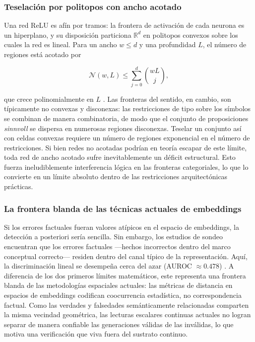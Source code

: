 \documentclass{article}
\begin{document}
\hypertarget{teselaciuxf3n-por-politopos-con-ancho-acotado}{%
\subsubsection{Teselación por politopos con ancho
acotado}\label{teselaciuxf3n-por-politopos-con-ancho-acotado}}

Una red ReLU es afín por tramos: la frontera de activación de cada
neurona es un hiperplano, y su disposición particiona \(\mathbb{R}^d\)
en politopos convexos sobre los cuales la red es lineal. Para un ancho
\(w \le d\) y una profundidad \(L\), el número de regiones está acotado
por

\[\mathcal{N}(w, L) \le \sum_{j=0}^{d} \binom{wL}{j},\]

que crece polinomialmente en \(L\) \citep{hanin2017universal}. Las
fronteras del sentido, en cambio, son típicamente no convexas y
disconexas: las restricciones de tipo sobre los símbolos se combinan de
manera combinatoria, de modo que el conjunto de proposiciones
\emph{sinnvoll} se dispersa en numerosas regiones disconexas. Teselar un
conjunto así con celdas convexas requiere un número de regiones
exponencial en el número de restricciones. Si bien redes no acotadas
podrían en teoría escapar de este límite, toda red de ancho acotado
sufre inevitablemente un déficit estructural. Esto fuerza
ineludiblemente interferencia lógica en las fronteras categoriales, lo
que lo convierte en un límite absoluto dentro de las restricciones
arquitectónicas prácticas.

\hypertarget{la-frontera-blanda-de-las-tuxe9cnicas-actuales-de-embeddings}{%
\subsubsection{La frontera blanda de las técnicas actuales de
embeddings}\label{la-frontera-blanda-de-las-tuxe9cnicas-actuales-de-embeddings}}

Si los errores factuales fueran valores atípicos en el espacio de
embeddings, la detección a posteriori sería sencilla. Sin embargo, los
estudios de sondeo encuentran que los errores factuales ---hechos
incorrectos dentro del marco conceptual correcto--- residen dentro del
canal típico de la representación. Aquí, la discriminación lineal se
desempeña cerca del azar (AUROC \(\approx 0.478\))
\citep{wei2024measuring}. A diferencia de los dos primeros límites
matemáticos, este representa una frontera blanda de las metodologías
espaciales actuales: las métricas de distancia en espacios de embeddings
codifican coocurrencia estadística, no correspondencia factual. Como las
verdades y falsedades semánticamente relacionadas comparten la misma
vecindad geométrica, las lecturas escalares continuas actuales no logran
separar de manera confiable las generaciones válidas de las inválidas,
lo que motiva una verificación que viva fuera del sustrato continuo.
\end{document}
